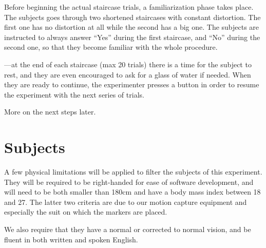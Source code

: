 Before beginning the actual staircase trials, a familiarization phase takes place. The subjects goes through two shortened staircases with constant distortion. The first one has no distortion at all while the second has a big one. The subjects are instructed to always answer ``Yes'' during the first staircase, and ``No'' during the second one, so that they become familiar with the whole procedure.

---at the end of each staircase (max 20 trials) there is a time for the subject to rest, and they are even encouraged to ask for a glass of water if needed. When they are ready to continue, the experimenter presses a button in order to resume the experiment with the next series of trials.

More on the next steps later.

\section{Subjects}

A few physical limitations will be applied to filter the subjects of this experiment. They will be required to be right-handed for ease of software development, and will need to be both smaller than 180cm and have a body mass index between 18 and 27. The latter two criteria are due to our motion capture equipment and especially the suit on which the markers are placed.

We also require that they have a normal or corrected to normal vision, and be fluent in both written and spoken English.
